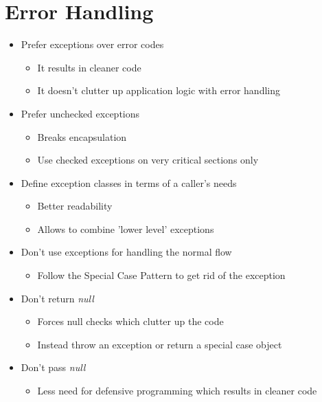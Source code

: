 \section{Error Handling}
\begin{itemize}
    \item Prefer exceptions over error codes
    \begin{itemize}
        \item It results in cleaner code
        \item It doesn't clutter up application logic with error handling
    \end{itemize}
    \item Prefer unchecked exceptions
    \begin{itemize}
        \item Breaks encapsulation
        \item Use checked exceptions on very critical sections only
    \end{itemize}
    \item Define exception classes in terms of a caller's needs
    \begin{itemize}
        \item Better readability
        \item Allows to combine 'lower level' exceptions
    \end{itemize}
    \item Don't use exceptions for handling the normal flow
    \begin{itemize}
        \item Follow the Special Case Pattern to get rid of the exception
    \end{itemize}
    \item Don't return \textit{null}
    \begin{itemize}
        \item Forces null checks which clutter up the code
        \item Instead throw an exception or return a special case object
    \end{itemize}
    \item Don't pass \textit{null}
    \begin{itemize}
        \item Less need for defensive programming which results in cleaner code
    \end{itemize}
\end{itemize}
